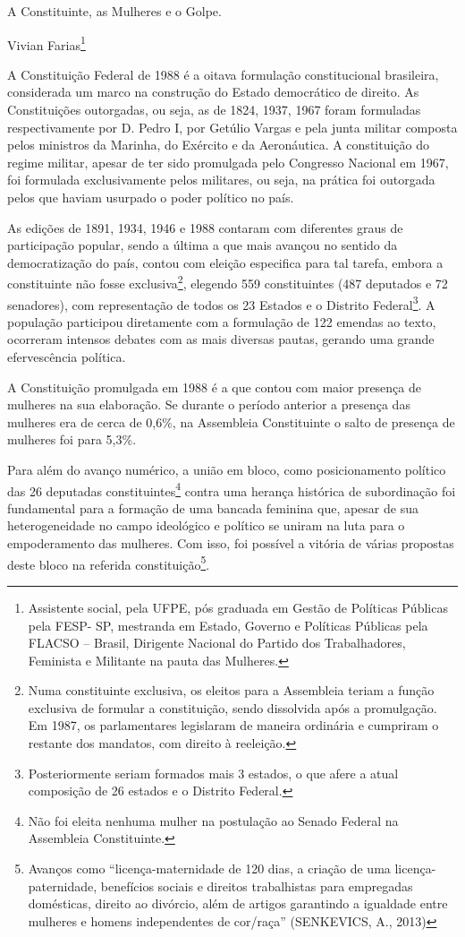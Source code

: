 A Constituinte, as Mulheres e o Golpe.

Vivian Farias\footnote{Assistente social, pela UFPE, pós graduada em
  Gestão de Políticas Públicas pela FESP- SP, mestranda em Estado,
  Governo e Políticas Públicas pela FLACSO -- Brasil, Dirigente Nacional
  do Partido dos Trabalhadores, Feminista e Militante na pauta das
  Mulheres.}

A Constituição Federal de 1988 é a oitava formulação constitucional
brasileira, considerada um marco na construção do Estado democrático de
direito. As Constituições outorgadas, ou seja, as de 1824, 1937, 1967
foram formuladas respectivamente por D. Pedro I, por Getúlio Vargas e
pela junta militar composta pelos ministros da Marinha, do Exército e da
Aeronáutica. A constituição do regime militar, apesar de ter sido
promulgada pelo Congresso Nacional em 1967, foi formulada exclusivamente
pelos militares, ou seja, na prática foi outorgada pelos que haviam
usurpado o poder político no país.

As edições de 1891, 1934, 1946 e 1988 contaram com diferentes graus de
participação popular, sendo a última a que mais avançou no sentido da
democratização do país, contou com eleição especifica para tal tarefa,
embora a constituinte não fosse exclusiva\footnote{Numa constituinte
  exclusiva, os eleitos para a Assembleia teriam a função exclusiva de
  formular a constituição, sendo dissolvida após a promulgação. Em 1987,
  os parlamentares legislaram de maneira ordinária e cumpriram o
  restante dos mandatos, com direito à reeleição.}, elegendo 559
constituintes (487 deputados e 72 senadores), com representação de todos
os 23 Estados e o Distrito Federal\footnote{Posteriormente seriam
  formados mais 3 estados, o que afere a atual composição de 26 estados
  e o Distrito Federal.}. A população participou diretamente com a
formulação de 122 emendas ao texto, ocorreram intensos debates com as
mais diversas pautas, gerando uma grande efervescência política.

A Constituição promulgada em 1988 é a que contou com maior presença de
mulheres na sua elaboração. Se durante o período anterior a presença das
mulheres era de cerca de 0,6\%, na Assembleia Constituinte o salto de
presença de mulheres foi para 5,3\%.

Para além do avanço numérico, a união em bloco, como posicionamento
político das 26 deputadas constituintes\footnote{Não foi eleita nenhuma
  mulher na postulação ao Senado Federal na Assembleia Constituinte.}
contra uma herança histórica de subordinação foi fundamental para a
formação de uma bancada feminina que, apesar de sua heterogeneidade no
campo ideológico e político se uniram na luta para o empoderamento das
mulheres. Com isso, foi possível a vitória de várias propostas deste
bloco na referida constituição\footnote{Avanços como
  ``licença-maternidade de 120 dias, a criação de uma
  licença-paternidade, benefícios sociais e direitos trabalhistas para
  empregadas domésticas, direito ao divórcio, além de artigos garantindo
  a igualdade entre mulheres e homens independentes de cor/raça''
  (SENKEVICS, A., 2013)}.

